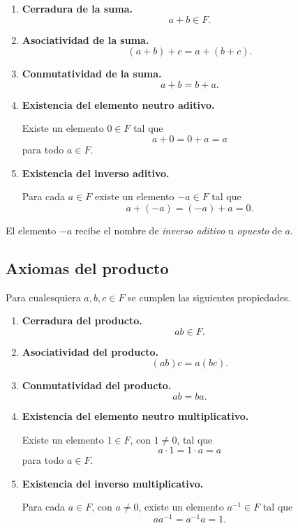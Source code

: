 \documentclass[12pt]{article}
\begin{document}
\begin{enumerate}[label=\textbf{A\arabic*.}]

    \item \textbf{Cerradura de la suma.}
    \[
    a+b\in F.
    \]

    \item \textbf{Asociatividad de la suma.}
    \[
    (a+b)+c=a+(b+c).
    \]

    \item \textbf{Conmutatividad de la suma.}
    \[
    a+b=b+a.
    \]

    \item \textbf{Existencia del elemento neutro aditivo.}

    Existe un elemento $0\in F$ tal que
    \[
    a+0=0+a=a
    \]
    para todo $a\in F$.

    \item \textbf{Existencia del inverso aditivo.}

    Para cada $a\in F$ existe un elemento $-a\in F$ tal que
    \[
    a+(-a)=(-a)+a=0.
    \]

\end{enumerate}

El elemento $-a$ recibe el nombre de \emph{inverso aditivo} u
\emph{opuesto} de $a$.

\subsection*{Axiomas del producto}

Para cualesquiera $a,b,c\in F$ se cumplen las siguientes propiedades.

\begin{enumerate}[label=\textbf{M\arabic*.}]

    \item \textbf{Cerradura del producto.}
    \[
    ab\in F.
    \]

    \item \textbf{Asociatividad del producto.}
    \[
    (ab)c=a(bc).
    \]

    \item \textbf{Conmutatividad del producto.}
    \[
    ab=ba.
    \]

    \item \textbf{Existencia del elemento neutro multiplicativo.}

    Existe un elemento $1\in F$, con $1\neq0$, tal que
    \[
    a\cdot1=1\cdot a=a
    \]
    para todo $a\in F$.

    \item \textbf{Existencia del inverso multiplicativo.}

    Para cada $a\in F$, con $a\neq0$, existe un elemento
    $a^{-1}\in F$ tal que
    \[
    aa^{-1}=a^{-1}a=1.
    \]

\end{enumerate}
\end{document}
